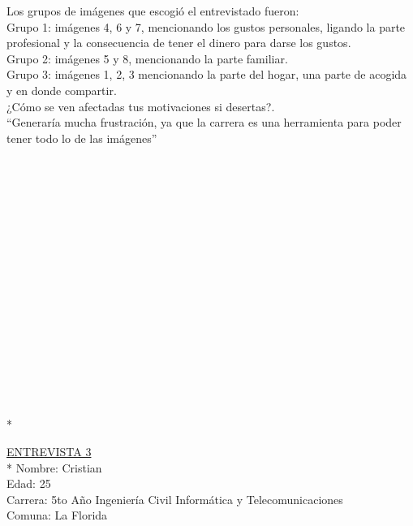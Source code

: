 Los grupos de imágenes que escogió el entrevistado fueron:\\

Grupo 1: imágenes 4, 6 y 7, mencionando los gustos personales, ligando la parte profesional y la consecuencia de tener el dinero para darse los gustos.\\

Grupo 2: imágenes 5 y 8, mencionando la parte familiar.\\

Grupo 3: imágenes 1, 2, 3  mencionando la parte del hogar, una parte de acogida y en donde compartir.\\

¿Cómo se ven afectadas tus motivaciones si desertas?.\\

``Generaría mucha frustración, ya que la carrera es una herramienta para poder tener todo lo de las imágenes''\\
\\
\\
\\
\\
\\
\\
\\
\\
\\
\\
\\
\\
\\
\\
\\
\\
\\*

\underline {ENTREVISTA 3} \\* 
Nombre: Cristian\\
Edad: 25\\
Carrera: 5to Año Ingeniería Civil Informática y Telecomunicaciones\\
Comuna: La Florida\\

